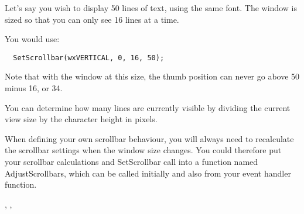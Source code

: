 



Let's say you wish to display 50 lines of text, using the same font.
The window is sized so that you can only see 16 lines at a time.

You would use:

{\small%
\begin{verbatim}
  SetScrollbar(wxVERTICAL, 0, 16, 50);
\end{verbatim}
}

Note that with the window at this size, the thumb position can never go
above 50 minus 16, or 34.

You can determine how many lines are currently visible by dividing the current view
size by the character height in pixels.

When defining your own scrollbar behaviour, you will always need to recalculate
the scrollbar settings when the window size changes. You could therefore put your
scrollbar calculations and SetScrollbar
call into a function named AdjustScrollbars, which can be called initially and also
from your  event handler function.


,\rtfsp
{}, 

